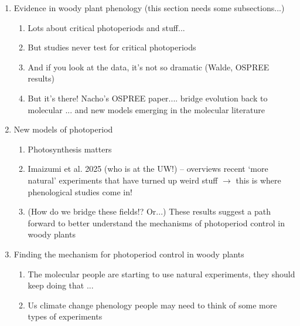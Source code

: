 \documentclass[11pt]{article}
\begin{document}
\begin{enumerate}
\begin{enumerate}
\item Hourglass
\item Circadian Clock (internal vs. external coincidence model)
\begin{enumerate}
\item External is one clock
\item Internal is TWO clocks
\item I think that both are out there, but internal is ``more widely supported'' in animals (Imaizumi)
\end{enumerate}
\end{enumerate}
\item Evidence in woody plant phenology (this section needs some subsections...)
\begin{enumerate}
\item Lots about critical photoperiods and stuff...
\item But studies never test for critical photoperiods
\item And if you look at the data, it's not so dramatic (Walde, OSPREE results)
\item But it's there! Nacho's OSPREE paper.... bridge evolution back to molecular ... and new models emerging in the molecular literature
\end{enumerate}
\item New models of photoperiod 
\begin{enumerate}
\item Photosynthesis matters
\item Imaizumi et al. 2025 (who is at the UW!) -- overviews recent `more natural' experiments that have turned up weird stuff $\rightarrow$ this is where phenological studies come in!
\item (How do we bridge these fields!? Or...) These results suggest a path forward to better understand the mechanisms of photoperiod control in woody plants %
\end{enumerate}
\item Finding the mechanism for photoperiod control in woody plants 
\begin{enumerate}
\item The molecular people are starting to use natural experiments, they should keep doing that ... 
\item Us climate change phenology people may need to think of some more types of experiments %

\end{enumerate}
\end{enumerate}
\end{document}
